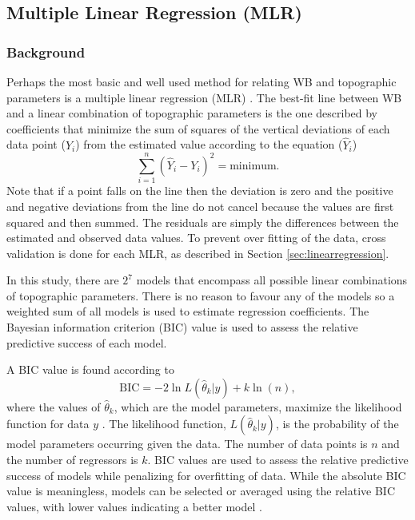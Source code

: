 \documentclass{sfuthesis}
\begin{document}
\subsection{Multiple Linear Regression (MLR)}
\label{sec:MLR}

\subsubsection{Background}

Perhaps the most basic and well used method for relating WB and topographic parameters is a multiple linear regression (MLR) \citep[e.g.][]{Cohen2013}. The best-fit line between WB and a linear combination of topographic parameters is the one described by coefficients that minimize the sum of squares of the vertical deviations of each data point ($Y_i$) from the estimated value according to the equation ($\hat{Y}_i$) \citep{Davis1986}
\begin{equation}
\sum^n_{i=1}(\hat{Y}_i-Y_i)^2 = \mathrm{minimum}.
\end{equation}
Note that if a point falls on the line then the deviation is zero and  the positive and negative deviations from the line do not cancel because the values are first squared and then summed. The residuals are simply the differences between the estimated and observed data values. To prevent over fitting of the data, cross validation is done for each MLR, as described in Section \ref{sec:linearregression}.

In this study, there are $2^7$ models that encompass all possible linear combinations of topographic parameters. There is no reason to favour any of the models so a weighted sum of all models is used to estimate regression coefficients.   The Bayesian information criterion (BIC) value is used to assess the relative predictive success of each model. 

A BIC value is found according to
\begin{equation}
\textrm{BIC} = -2 \ln L(\hat\theta_k  | y) + k \ln(n),
\end{equation}
where the values of $\hat \theta_k$, which are the model parameters, maximize the likelihood function for data $y$ \citep{Burnham2004}. The likelihood function, $ L(\hat\theta_k  | y)$, is the probability of the model parameters occurring given the data. The number of data points is $n$ and the number of regressors is $k$. BIC values are used to assess the relative predictive success of models while penalizing for overfitting of data. While the absolute BIC value is meaningless, models can be selected or averaged using the relative BIC values, with lower values indicating a better model \citep{Burnham2004}. 
\end{document}
